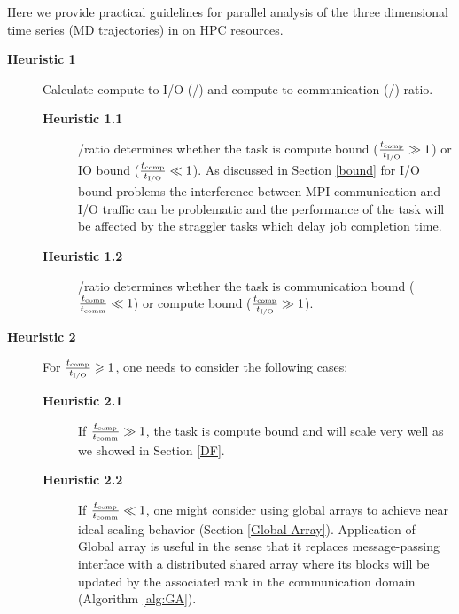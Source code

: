 \label{guideline}
Here we provide practical guidelines for parallel analysis of the three dimensional time series (MD trajectories) in  on HPC resources.

\begin{description}
  \item[\textbf{Heuristic 1}] Calculate compute to I/O (\tcomp/\tIO) and compute to communication (\tcomp/\tcomm) ratio. 
  \begin{description}
  \item[\textbf{Heuristic 1.1}] \tcomp/\tIO ratio determines whether the task is compute bound ($\frac{{t}_{\text{comp}}}{{t}_{\text{I/O}}} \gg 1$) or IO bound ($\frac{{t}_{\text{comp}}}{{t}_{\text{I/O}}} \ll 1$). 
  As discussed in Section \ref{bound} for I/O bound problems the interference between MPI communication and I/O traffic can be problematic \cite{VMD2013, Kevin2018} and the performance of the task will be affected by the straggler tasks which delay job completion time.  
  \item[\textbf{Heuristic 1.2}] \tcomp/\tcomm ratio determines whether the task is communication bound ($\frac{{t}_{\text{comp}}}{t_{\text{comm}}} \ll 1$) or compute bound ($\frac{{t}_{\text{comp}}}{{t}_{\text{I/O}}} \gg 1$).
  \end{description}
  
  \item[\textbf{Heuristic 2}] For $\frac{{t}_{\text{comp}}}{{t}_{\text{I/O}}} \geqslant 1$, one needs to consider the following cases: 
  \begin{description}
  \item[\textbf{Heuristic 2.1}] If $\frac{{t}_{\text{comp}}}{t_{\text{comm}}} \gg 1$, the task is compute bound and will scale very well as we showed in Section \ref{DF}.
  \item[\textbf{Heuristic 2.2}] If $\frac{{t}_{\text{comp}}}{t_{\text{comm}}} \ll 1$, one might consider using global arrays to achieve near ideal scaling behavior (Section \ref{Global-Array}). 
  Application of Global array is useful in the sense that it replaces message-passing interface with a distributed shared array where its 
  blocks will be updated by the associated rank in the communication domain (Algorithm \ref{alg:GA}). 
  \end{description}
  

\end{description}
